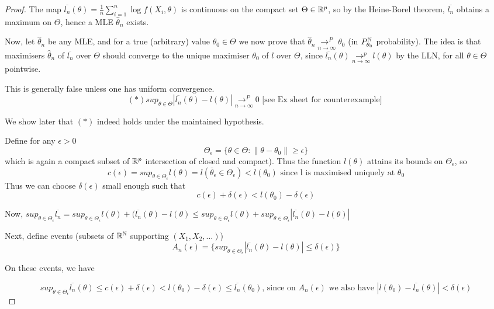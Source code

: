 \documentclass[a4paper]{article}
\begin{document}
\begin{proof}
	The map $\overline{l_{n}}(\theta) = \frac{1}{n} \sum_{i=1}^{n} \log f(X_i, \theta)$ is continuous on the compact set $\Theta \in \mathbb{R}^{p}$, so by the Heine-Borel theorem, $\overline{l_n}$ obtains a maximum on $\Theta$, hence a MLE  $\hat{\theta}_n $ exists.

	Now, let  $\hat{\theta}_n$ be any MLE, and for a true (arbitrary) value $\theta_0 \in \Theta$ we now prove that $\hat{\theta}_n \underset{n\to \infty}{\to ^{P}} \theta_0$ (in $P_{\theta_0}^{\mathbb{N}}$ probability). The idea is that maximisers $\hat{\theta}_n$ of $\overline{l_n}$ over $\Theta$ should converge to the unique maximiser  $\theta_0$ of $l$ over $\Theta$, since  $\overline{l_n}(\theta) \underset{n\to \infty}{\to ^{p}} l(\theta)$ by the LLN, for all $\theta \in  \Theta$ pointwise.

	This is generally false unless one has uniform convergence.
	\[
		(\ast) sup_{\theta \in \Theta} |\overline{l_n}(\theta) - l(\theta)| \underset{n\to \infty}{\to ^{P}} 0 \text{ [see Ex sheet for counterexample] }
	\] 

	We show later that $(\ast)$ indeed holds under the maintained hypothesis.

	Define for any $\epsilon > 0$ 
	\[
		\Theta_{\epsilon} = \{\theta \in  \Theta : \|\theta - \theta_0\| \ge \epsilon\} 
	\] 
	which is again a compact subset of $\mathbb{R}^{p}$ intersection of closed and compact). Thus the function $l(\theta)$ attains its bounds on  $\Theta_{\epsilon}$, so
	\[
		c(\epsilon) = sup_{\theta \in \Theta_{\epsilon}} l(\theta) = l(\overline{\theta}_{\epsilon} \in \Theta_{\epsilon}) < l(\theta_0) \text{ since l is maximised uniquely at } \theta_0
	\] 
	Thus we can choose $\delta(\epsilon)$ small enough such that 
	 \[
	 c(\epsilon) + \delta(\epsilon) < l(\theta_0) - \delta(\epsilon) \tag{\dag}
	\]

	Now, $sup_{\theta \in  \Theta_{\epsilon}} \overline{l_n} = sup_{\theta \in \Theta_{\epsilon}} l(\theta) + (\overline{l_n}(\theta) - l(\theta) \le sup_{\theta \in \Theta_{\epsilon}} l(\theta) + sup_{\theta \in \Theta_{\epsilon}} |\overline{l_n} (\theta) - l(\theta)|$

	Next, define events (subsets of $\mathbb{R}^{\mathbb{N}}$ supporting $(X_1, X_2,\ldots)$) 
	\[
		A_n(\epsilon) = \{sup_{\theta \in \Theta_{\epsilon}} |\overline{l_n}(\theta) - l(\theta) | \le  \delta(\epsilon)\} 
	\] 

	On these events, we have 

	\[
		sup_{\theta \in \Theta_{\epsilon}} \overline{l_n} (\theta) \le  c(\epsilon) + \delta(\epsilon) < l(\theta_0) - \delta(\epsilon) \le \overline{l_n}(\theta_{0}) \text{, since on $A_n(\epsilon)$ we also have } |l(\theta_0) - \overline{l_n}(\theta)| < \delta(\epsilon)
	\] 


\end{proof}
\end{document}
